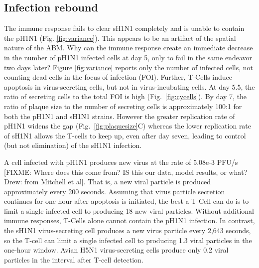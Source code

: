 \documentclass[10pt]{article}
\begin{document}
\subsection*{Infection rebound}


The immune response fails to clear sH1N1 completely and is unable to contain the pH1N1 (Fig. \ref{fig:variance}).  This appears to be an artifact of the spatial nature of the ABM.  Why can the immune response create an immediate decrease in the number of pH1N1 infected cells at day 5, only to fail in the same endeavor two days later?   Figure \ref{fig:variance} reports only the number of infected cells, not counting dead cells in the focus of infection (FOI).  Further, T-Cells induce apoptosis in virus-secreting cells, but not in virus-incubating cells.  At day 5.5, the ratio of secreting cells to the total FOI is high (Fig.~\ref{fig:cycells}). By day 7, the ratio of plaque size to the number of secreting cells is approximately 100:1 for both the pH1N1 and sH1N1 strains.  However the greater replication rate of pH1N1 widens the gap (Fig.~\ref{fig:plaquesize}C) whereas the lower replication rate of sH1N1 allows the T-cells to keep up, even after day seven, leading to control (but not elimination) of the sH1N1 infection.

A cell infected with pH1N1 produces new virus at the rate of 5.08e-3 PFU/s [FIXME: Where does this come from? IS this our data, model results, or what? Drew: from Mitchell et al].  That is, a new viral particle is produced approximately every 200 seconds.  Assuming that virus particle secretion continues for one hour after apoptosis is initiated, the best a T-Cell can do is to limit a single infected cell to producing 18 new viral particles.  Without additional immune responses, T-Cells alone cannot contain the pH1N1 infection.  In contrast, the sH1N1 virus-secreting cell produces a new virus particle every 2,643 seconds, so the T-cell can limit a single infected cell to producing 1.3 viral particles in the one-hour window.  Avian H5N1 virus-secreting cells produce only 0.2 viral particles in the interval after T-cell detection. 
\end{document}

